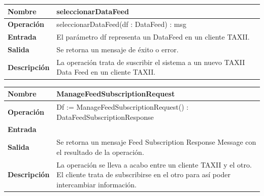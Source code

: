 \documentclass[11pt]{article}
\begin{document}
\bigskip

\begin{flushleft}
\tablefirsthead{}
\tablehead{}
\tabletail{}
\tablelasttail{}
\begin{supertabular}{|m{1.0115598in}|m{4.7441597in}|}
\hline
{\bfseries Nombre} &
{\bfseries seleccionarDataFeed}\\\hline
{\bfseries Operación} &
{ seleccionarDataFeed(df : DataFeed) : msg}\\\hline
{\bfseries Entrada} &
{ El parámetro df representa un DataFeed en un cliente TAXII.}\\\hline
{\bfseries Salida} &
{ Se retorna un mensaje de éxito o error.}\\\hline
{\bfseries Descripción} &
{ La operación trata de suscribir el sistema a un nuevo TAXII Data Feed en un cliente
TAXII.}\\\hline
\end{supertabular}
\end{flushleft}

\bigskip

\begin{flushleft}
\tablefirsthead{}
\tablehead{}
\tabletail{}
\tablelasttail{}
\begin{supertabular}{|m{1.0115598in}|m{4.7441597in}|}
\hline
{\bfseries Nombre} &
{\bfseries ManageFeedSubscriptionRequest}\\\hline
{\bfseries Operación} &
{ Df := ManageFeedSubscriptionRequest() : DataFeedSubscriptionResponse}\\\hline
{\bfseries Entrada} &
~
\\\hline
{\bfseries Salida} &
{ Se retorna un mensaje Feed Subscription Response Message con el resultado de la
operación.}\\\hline
{\bfseries Descripción} &
{ La operación se lleva a acabo entre un cliente TAXII y el otro. El cliente trata de
subscribirse en el otro para así poder intercambiar información.}\\\hline
\end{supertabular}
\end{flushleft}
\end{document}
